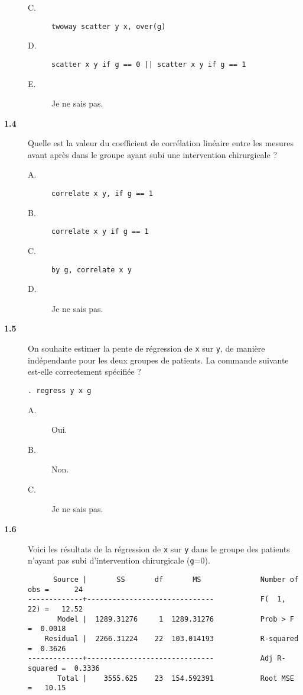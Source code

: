 \begin{description}
\begin{description}
\item[C.] \verb|twoway scatter y x, over(g)|
\item[D.] \verb+scatter x y if g == 0 || scatter x y if g == 1+
\item[E.] Je ne sais pas.
\end{description}
\item[\bf 1.4] Quelle est la valeur du coefficient de corrélation linéaire
  entre les mesures avant après dans le groupe ayant subi une intervention
  chirurgicale ? 
\begin{description}
\item[A.] \verb|correlate x y, if g == 1|
\item[B.] \verb|correlate x y if g == 1|
\item[C.] \verb|by g, correlate x y|
\item[D.] Je ne sais pas.
\end{description}
\item[\bf 1.5] On souhaite estimer la pente de régression de \texttt{x} sur
  \texttt{y}, de manière indépendante pour les deux groupes de patients. La
  commande suivante est-elle correctement spécifiée ? 
\begin{verbatim}
. regress y x g
\end{verbatim}
\begin{description}
\item[A.] Oui.
\item[B.] Non.
\item[C.] Je ne sais pas.
\end{description}
\item[\bf 1.6]  Voici les résultats de la régression de \texttt{x} sur
  \texttt{y} dans le groupe des patients n'ayant pas subi d'intervention
  chirurgicale (\texttt{g}=0). 
\begin{verbatim}
      Source |       SS       df       MS              Number of obs =      24
-------------+------------------------------           F(  1,    22) =   12.52
       Model |  1289.31276     1  1289.31276           Prob > F      =  0.0018
    Residual |  2266.31224    22  103.014193           R-squared     =  0.3626
-------------+------------------------------           Adj R-squared =  0.3336
       Total |    3555.625    23  154.592391           Root MSE      =   10.15


\end{verbatim}
\end{description}
